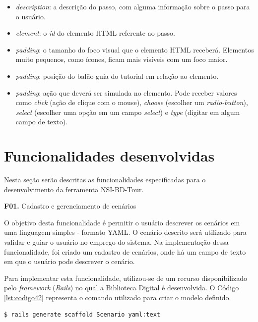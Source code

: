 \begin{itemize}
\item \textit{description}: a descrição do passo, com alguma informação sobre o passo para o usuário.

\item \textit{element}: o \textit{id} do elemento HTML referente ao passo.

\item \textit{padding}: o tamanho do foco visual que o elemento HTML receberá. Elementos muito pequenos, como ícones, ficam mais visíveis com um foco maior.

\item \textit{padding}: posição do balão-guia do tutorial em relação ao elemento.

\item \textit{padding}: ação que deverá ser simulada no elemento. Pode receber valores como \textit{click} (ação de clique com o mouse), \textit{choose} (escolher um \textit{radio-button}), \textit{select} (escolher uma opção em um campo \textit{select}) e \textit{type} (digitar em algum campo de texto).

\end{itemize}


\section{Funcionalidades desenvolvidas}

Nesta seção serão descritas as funcionalidades especificadas para o desenvolvimento da ferramenta NSI-BD-Tour.

\textbf{F01.} Cadastro e gerenciamento de cenários

O objetivo desta funcionalidade é permitir o usuário descrever os cenários em uma linguagem simples - formato YAML. O cenário descrito será utilizado para validar e guiar o usuário no emprego do sistema. Na implementação dessa funcionalidade, foi criado um cadastro de cenários, onde há um campo de texto em que o usuário pode descrever o cenário.

Para implementar esta funcionalidade, utilizou-se de um recurso disponibilizado pelo \textit{framework} (\textit{Rails}) no qual a Biblioteca Digital é desenvolvida. O Código \ref{lst:codigo42} representa o comando utilizado para criar o modelo definido.

{\singlespace
\begin{lstlisting}[caption=Comando para gerar um modelo,label={lst:codigo42}]
$ rails generate scaffold Scenario yaml:text
\end{lstlisting}
}

